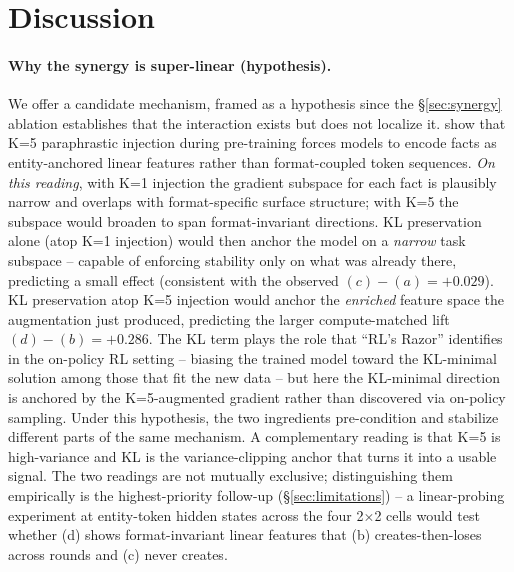 \documentclass[11pt]{article}
\begin{document}
\section{Discussion}
\label{sec:discussion}

\paragraph{Why the synergy is super-linear (hypothesis).}
We offer a candidate mechanism, framed as a hypothesis since the
\S\ref{sec:synergy} ablation establishes that the interaction exists but
does not localize it. \citet{allenzhu2023knowledge} show that K=5
paraphrastic injection during pre-training forces models to encode facts
as entity-anchored linear features rather than format-coupled token
sequences. \emph{On this reading}, with K=1 injection the gradient
subspace for each fact is plausibly narrow and overlaps with
format-specific surface structure; with K=5 the subspace would broaden to
span format-invariant directions. KL preservation alone (atop K=1
injection) would then anchor the model on a \emph{narrow} task subspace --
capable of enforcing stability only on what was already there, predicting
a small effect (consistent with the observed $(c) - (a) = +0.029$). KL
preservation atop K=5 injection would anchor the \emph{enriched} feature
space the augmentation just produced, predicting the larger
compute-matched lift $(d) - (b) = +0.286$. The KL term plays the role
that ``RL's Razor'' \citep{shenfeld2025rlsrazor} identifies in the
on-policy RL setting -- biasing the trained model toward the KL-minimal
solution among those that fit the new data -- but here the KL-minimal
direction is anchored by the K=5-augmented gradient rather than
discovered via on-policy sampling. Under this hypothesis, the two
ingredients pre-condition and stabilize different parts of the same
mechanism. A complementary reading
\citep[LoRA Knowledge Packing:][]{pletenev2025lora} is that K=5 is
high-variance and KL is the variance-clipping anchor that turns it into a
usable signal. The two readings are not mutually exclusive; distinguishing
them empirically is the highest-priority follow-up
(\S\ref{sec:limitations}) -- a linear-probing experiment at entity-token
hidden states across the four 2$\times$2 cells would test whether (d)
shows format-invariant linear features that (b) creates-then-loses across
rounds and (c) never creates.
\end{document}
